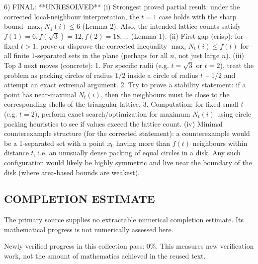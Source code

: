 6) FINAL: **UNRESOLVED**
(i) Strongest proved partial result: under the corrected local-neighbour interpretation, the $t=1$ case holds with the sharp bound $\max_i N_1(i)\le 6$ (Lemma 2). Also, the intended lattice counts satisfy $f(1)=6,f(\sqrt3)=12,f(2)=18,\ldots$ (Lemma 1).
(ii) First gap (crisp): for fixed $t>1$, prove or disprove the corrected inequality $\max_i N_t(i)\le f(t)$ for all finite $1$-separated sets in the plane (perhaps for all $n$, not just large $n$).
(iii) Top 3 next moves (concrete):
  1. For specific radii (e.g. $t=\sqrt3$ or $t=2$), treat the problem as packing circles of radius $1/2$ inside a circle of radius $t+1/2$ and attempt an exact extremal argument.
  2. Try to prove a stability statement: if a point has near-maximal $N_t(i)$, then the neighbours must lie close to the corresponding shells of the triangular lattice.
  3. Computation: for fixed small $t$ (e.g. $t=2$), perform exact search/optimization for maximum $N_t(i)$ using circle packing heuristics to see if values exceed the lattice count.
(iv) Minimal counterexample structure (for the corrected statement): a counterexample would be a 1-separated set with a point $x_0$ having more than $f(t)$ neighbours within distance $t$, i.e. an unusually dense packing of equal circles in a disk. Any such configuration would likely be highly symmetric and live near the boundary of the disk (where area-based bounds are weakest).



\subsection*{COMPLETION ESTIMATE}
The primary source supplies no extractable numerical completion estimate. Its mathematical progress is not numerically assessed here.

Newly verified progress in this collection pass: $0\%$. This measures new verification work, not the amount of mathematics achieved in the reused text.
